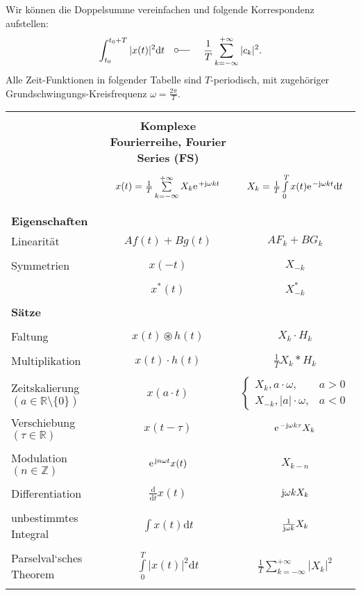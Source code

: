 \documentclass[11pt,a4paper,DIV=12]{scrartcl}
\begin{document}
Wir können die Doppelsumme vereinfachen und folgende Korrespondenz aufstellen:
%
\begin{align}
	\int_{t_0}^{t_0+T}|x(t)|^2\diff t
	\quad\fourier\quad\frac{1}{T}\sum_{k=-\infty}^{+\infty}|c_k|^2.
\end{align}
\newpage
Alle Zeit-Funktionen in folgender Tabelle sind $T$-periodisch, mit zugehöriger
Grundschwingungs-Kreisfrequenz $\omega = \frac{2\pi}{T}$.\\
\begin{tabular}{|lcc|}
	\hline
	&&\\
	&\textbf{Komplexe Fourierreihe, Fourier Series (FS)}& \\
	\hline
	&&\\
	& $x(t)=\frac{1}{T}\sum\limits_{k=-\infty}^{+\infty}X_k\e^{+\im\omega k t} $
	& $X_k=\frac{1}{T}\int\limits_0^Tx(t)\e^{-\im\omega k t}\mathrm{d}t $ \\&&\\
	\hline
	&&\\
	\textbf{Eigenschaften} & & \\
	Linearität & $Af(t)+Bg(t)$ & $AF_k+BG_k$\\&& \\
	Symmetrien & $x(-t)$ & $X_{-k}$ \\ &&\\
	& $x^*(t)$ & $X^*_{-k}$ \\ &&\\
	\hline
	\textbf{Sätze} & & \\&& \\
	Faltung & $x(t)\circledast h(t)$ & $X_k\cdot H_k$ \\&& \\
	Multiplikation & $x(t)\cdot h(t)$ & $\frac{1}{T}X_k \ast H_k $ \\&& \\
	Zeitskalierung $(a\in\mathbb{R}\setminus\{0\})$& $x(a\cdot t)$ & $\begin{cases}
		X_k,a\cdot\omega, &a>0\\
		X_{-k},|a|\cdot\omega, &a<0
	\end{cases}$\\
	Verschiebung $(\tau \in \mathbb{R})$ & $x(t-\tau)$& $\e^{-\im\omega k \tau}X_k$\\&& \\
	Modulation $(n \in \mathbb{Z})$& $\e^{\im n \omega t}x(t)$ & $X_{k-n}$ \\&& \\
	Differentiation & $\frac{\mathrm{d}}{\mathrm{d}t}x(t)$ & $\im\omega k X_k$\\&& \\
	unbestimmtes Integral &$\int x(t)\mathrm{d}t $ & $\frac{1}{\im\omega k}X_k$\\&& \\
	Parselval`sches Theorem & $\int\limits_0^T|x(t)|^2\mathrm{d}t$ & $\frac{1}{T}\sum\limits_{k=-\infty}^{+\infty}|X_k|^2$\\&& \\
	\hline
\end{tabular}







\clearpage

\end{document}

